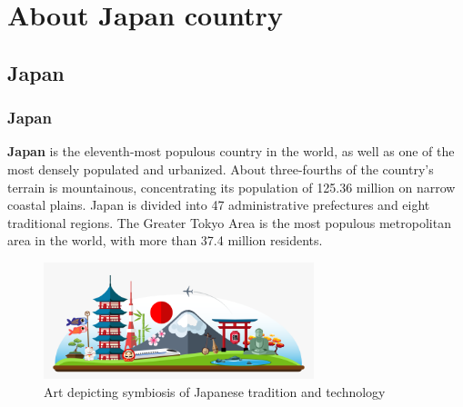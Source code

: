 \documentclass[9pt]{beamer}
\begin{document}
    \section{About Japan country}
        
        \subsection{Japan}
        \begin{frame}
            \frametitle{Japan}
                \justify
                 \textbf{Japan} is the eleventh-most populous country in the world, as well as one of the most densely populated and urbanized. About three-fourths of the country's terrain is mountainous, concentrating its population of 125.36 million on narrow coastal plains. Japan is divided into 47 administrative prefectures and eight traditional regions. The Greater Tokyo Area is the most populous metropolitan area in the world, with more than 37.4 million residents.
                \begin{figure}[h]
                    \centering
                    \includegraphics[width=0.7\textwidth]{images/japan.png}
                    \caption{Art depicting symbiosis of Japanese tradition and technology}
                    \label{fig:mesh1}
                \end{figure}
        \end{frame}

\end{document}
